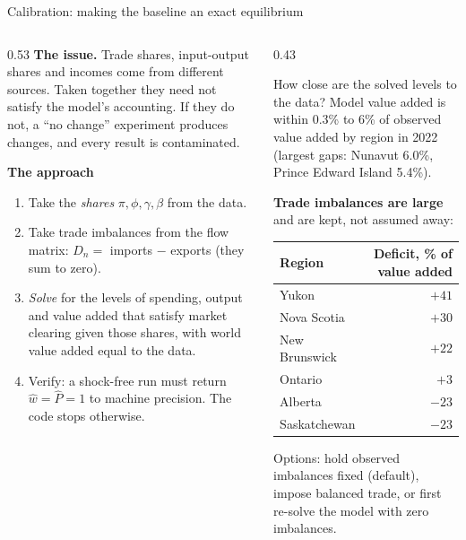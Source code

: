 \documentclass[aspectratio=169,9pt,t]{beamer}
\newcommand{\h}[1]{\hat{#1}}
\begin{document}
\begin{frame}{Calibration: making the baseline an exact equilibrium}
  \begin{columns}[T]
    \begin{column}{0.53\textwidth}
      \textbf{The issue.} Trade shares, input-output shares and incomes
      come from different sources. Taken together they need not satisfy
      the model's accounting. If they do not, a ``no change'' experiment
      produces changes, and every result is contaminated.

      \medskip
      \textbf{The approach}
      \begin{enumerate}
        \item Take the \emph{shares} $\pi,\phi,\gamma,\beta$ from the data.
        \item Take trade imbalances from the flow matrix:
              $D_n=$ imports $-$ exports (they sum to zero).
        \item \emph{Solve} for the levels of spending, output and value
              added that satisfy market clearing given those shares, with
              world value added equal to the data.
        \item Verify: a shock-free run must return $\h w=\h P=1$ to
              machine precision. The code stops otherwise.
      \end{enumerate}
    \end{column}
    \begin{column}{0.43\textwidth}
      \begin{block}{How close are the solved levels to the data?}
        \small Model value added is within 0.3\% to 6\% of observed value
        added by region in 2022 (largest gaps: Nunavut 6.0\%, Prince
        Edward Island 5.4\%).
      \end{block}
      \small
      \textbf{Trade imbalances are large} and are kept, not assumed away:
      \begin{center}
      \begin{tabular}{@{}lr@{}}
        \toprule
        Region & Deficit, \% of value added\\
        \midrule
        Yukon & $+41$\\
        Nova Scotia & $+30$\\
        New Brunswick & $+22$\\
        Ontario & $+3$\\
        Alberta & $-23$\\
        Saskatchewan & $-23$\\
        \bottomrule
      \end{tabular}
      \end{center}
      Options: hold observed imbalances fixed (default), impose balanced
      trade, or first re-solve the model with zero imbalances.
    \end{column}
  \end{columns}
\end{frame}
\end{document}
